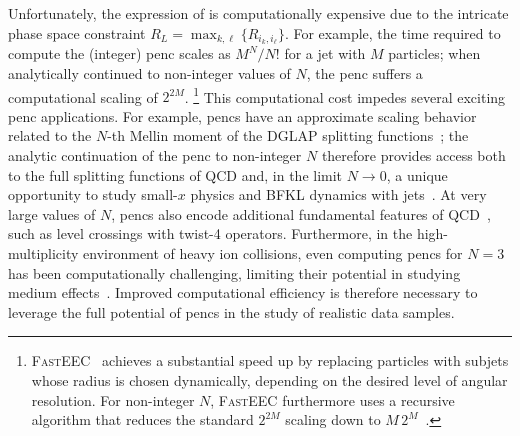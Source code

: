 Unfortunately, the expression of  is computationally expensive due to the intricate phase space constraint \(R_L = \max_{k,\ell}\{R_{i_k,i_\ell}\}\).
%
For example, the time required to compute the (integer) \gls{penc} scales as $M^N/N!$ for a jet with $M$ particles; when analytically continued to non-integer values of $N$, the \gls{penc} suffers  a computational scaling of $2^{2M}$.%
%
\footnote{
    \textsc{FastEEC}~\cite{Budhraja:2024xiq} achieves a substantial speed up by replacing particles with subjets whose radius is chosen dynamically, depending on the desired level of angular resolution.
    For non-integer $N$, \textsc{FastEEC} furthermore uses a recursive algorithm that reduces the standard $2^{2M}$ scaling down to $M\,2^M$~\cite{Budhraja:2024tev}.
}
%
This computational cost impedes several exciting \gls{penc} applications.
%
For example, \glspl{penc} have an approximate scaling behavior related to the $N$-th Mellin moment of the DGLAP splitting functions~\cite{Chen:2020vvp};
%
the analytic continuation of the \gls{penc} to non-integer $N$ therefore provides access both to the full splitting functions of QCD and, in the limit $N \to 0$, a unique opportunity to study small-$x$ physics and BFKL dynamics with jets~\cite{Chen:2020vvp, Budhraja:2024tev,Neill:2020bwv}.
%
At very large values of \(N\), \glspl{penc} also encode additional fundamental features of QCD~\cite{Chen:2020vvp,Dai:2024wff}, such as level crossings with twist-4 operators.
%
Furthermore, in the high-multiplicity environment of heavy ion collisions, even computing \glspl{penc} for \(N=3\) has been computationally challenging, limiting their potential in studying medium effects~\cite{Bossi:2024qho}.
%
Improved computational efficiency is therefore necessary to leverage the full potential of \glspl{penc} in the study of realistic data samples.


